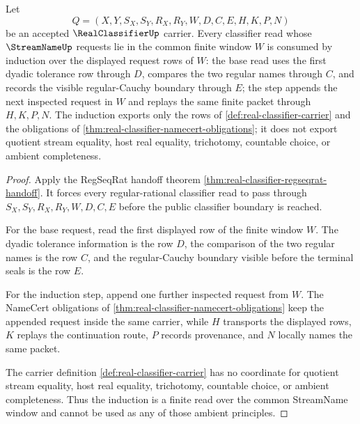 \begin{theorem}
\label{thm:realclassifier-regular-sequence-induction}
Let
$$
Q=(X,Y,S_X,S_Y,R_X,R_Y,W,D,C,E,H,K,P,N)
$$
be an accepted $\RealClassifierUp$ carrier. Every classifier read whose $\StreamNameUp$ requests lie in the common finite window $W$ is consumed by induction over the displayed request rows of $W$: the base read uses the first dyadic tolerance row through $D$, compares the two regular names through $C$, and records the visible regular-Cauchy boundary through $E$; the step appends the next inspected request in $W$ and replays the same finite packet through $H,K,P,N$. The induction exports only the rows of \autoref{def:real-classifier-carrier} and the obligations of \autoref{thm:real-classifier-namecert-obligations}; it does not export quotient stream equality, host real equality, trichotomy, countable choice, or ambient completeness.
\end{theorem}
\begin{proof}
Apply the RegSeqRat handoff theorem \autoref{thm:real-classifier-regseqrat-handoff}. It forces every regular-rational classifier read to pass through $S_X,S_Y,R_X,R_Y,W,D,C,E$ before the public classifier boundary is reached.

For the base request, read the first displayed row of the finite window $W$. The dyadic tolerance information is the row $D$, the comparison of the two regular names is the row $C$, and the regular-Cauchy boundary visible before the terminal seals is the row $E$.

For the induction step, append one further inspected request from $W$. The NameCert obligations of \autoref{thm:real-classifier-namecert-obligations} keep the appended request inside the same carrier, while $H$ transports the displayed rows, $K$ replays the continuation route, $P$ records provenance, and $N$ locally names the same packet.

The carrier definition \autoref{def:real-classifier-carrier} has no coordinate for quotient stream equality, host real equality, trichotomy, countable choice, or ambient completeness. Thus the induction is a finite read over the common StreamName window and cannot be used as any of those ambient principles.
\end{proof}

